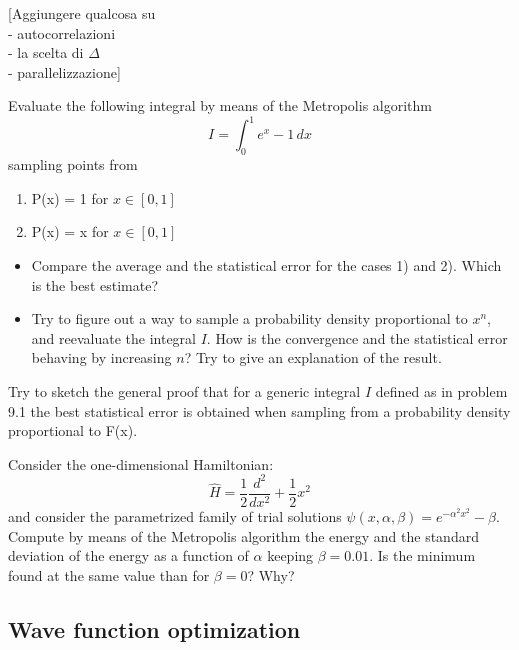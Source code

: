   [Aggiungere qualcosa su \\
  - autocorrelazioni \\
  - la scelta di $\Delta$ \\
  - parallelizzazione]
  
  \begin{prob}
  Evaluate the following integral by means of the Metropolis algorithm
  \[
  I=\int_0^1 e^{x}-1\, dx
  \]
  sampling points from
  \begin{enumerate}
  	\item P(x) = 1 for $x\in[0,1]$
  	\item P(x) = x for $x\in[0,1]$
  \end{enumerate}
  \begin{itemize}
  	\item
  Compare the average and the statistical error for the cases 1) and 2). Which is the best estimate?
  \item
  Try to figure out a way to sample a probability density proportional to $x^n$, and reevaluate the integral
  $I$. How is the convergence and the statistical error behaving by increasing $n$? Try to give an explanation of the result.  
  \end{itemize}
  \end{prob}
  \begin{prob}
  Try to sketch the general proof that for a generic integral $I$ defined as in problem 9.1 the best statistical error is obtained when sampling from a probability density proportional to F(x).
  \end{prob}
  \begin{prob}
  Consider the one-dimensional Hamiltonian:
  \[
  \hat{H}=\frac{1}{2}\frac{d^2}{dx^2}+\frac{1}{2}x^2
  \]
  and consider the parametrized family of trial solutions $\psi(x,\alpha,\beta)=e^{-\alpha^2 x^2}-\beta$. Compute by means of the  Metropolis algorithm the energy and the standard deviation of the energy as a function of $\alpha$ keeping $\beta=0.01$. Is the minimum found at the same value than for $\beta =0$? Why?
  \end{prob}

\subsection{Wave function optimization}

